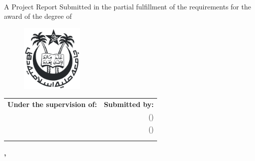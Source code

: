 \begin{titlepage}
    \begin{center}
        \begin{chaptersize}
            \textbf{\projectTitle{}}\\[\baselineskip]
        \end{chaptersize}
        \begin{sectionsize}
            A Project Report\linebreak
            Submitted in the partial fulfillment of the requirements for the
            award of the degree of\\[\baselineskip]
        \end{sectionsize}
        \begin{chaptersize}
            \textbf{\degreeName{}}
        \end{chaptersize}

        \vspace{30mm}
        \begin{figure}[H]
            \centering
            \includegraphics[width=30mm]{img/jmi.png}
        \end{figure}
        \vspace{30mm}

        \begin{sectionsize}
            \begin{center}
                \begin{tabularx}{\textwidth}{L R}
                    \textbf{Under the supervision of:} & \textbf{Submitted by:}\\
                    \mentorName{}                      & \authorAshhar{} (\authorAshharRoll{})\\
                    \mentorJobTitle{}                  & \authorAdeela{} (\authorAdeelaRoll{})\\
                     \\
                    \collegeName{}
                \end{tabularx}
            \end{center}

            \vfill

            \textbf{%
                \departmentName{}\linebreak
                \facultyName{}\linebreak
                \collegeName{}, \cityNamePin{}
            }
        \end{sectionsize}
    \end{center}
\end{titlepage}
